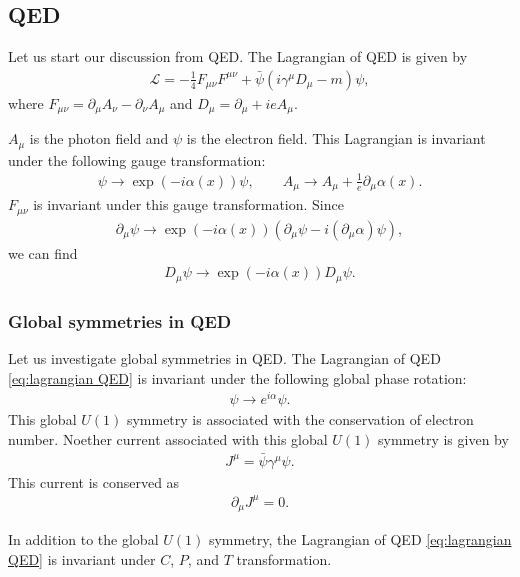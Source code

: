 \documentclass[11pt,a4paper]{article}
\begin{document}
\subsection{QED}
Let us start our discussion from QED. The Lagrangian of QED is given by
\begin{align}
    \mathcal{L} = -\frac{1}{4} F_{\mu\nu} F^{\mu\nu} + \bar\psi (i\gamma^\mu D_\mu - m) \psi, \label{eq:lagrangian QED}
\end{align}
where $F_{\mu\nu} = \partial_\mu A_\nu - \partial_\nu A_\mu$ and $D_\mu = \partial_\mu + i e A_\mu$.

$A_\mu$ is the photon field and $\psi$ is the electron field.
This Lagrangian is invariant under the following gauge transformation:
\begin{align}
    \psi \to \exp\left( -i\alpha(x) \right) \psi,\qquad
    A_\mu \to A_\mu + \frac{1}{e}\partial_\mu \alpha(x). \label{eq:gauge transformation QED}
\end{align}
$F_{\mu\nu}$ is invariant under this gauge transformation.
Since
\begin{align}
    \partial_\mu \psi \to \exp\left( -i\alpha(x) \right) \left( \partial_\mu \psi - i (\partial_\mu\alpha) \psi \right),
\end{align}
we can find
\begin{align}
    D_\mu \psi \to \exp\left( -i\alpha(x) \right) D_\mu \psi.
\end{align}


\subsubsection{Global symmetries in QED}
Let us investigate global symmetries in QED. The Lagrangian of QED \eqref{eq:lagrangian QED} is invariant under the following global phase rotation:
\begin{align}
    \psi \to e^{i\alpha} \psi.
\end{align}
This global $U(1)$ symmetry is associated with the conservation of electron number.
Noether current associated with this global $U(1)$ symmetry is given by
\begin{align}
    J^\mu = \bar\psi \gamma^\mu \psi.
\end{align}
This current is conserved as
\begin{align}
    \partial_\mu J^\mu = 0.
\end{align}

In addition to the global $U(1)$ symmetry, the Lagrangian of QED \eqref{eq:lagrangian QED} is invariant under $C$, $P$, and $T$ transformation.
\end{document}
